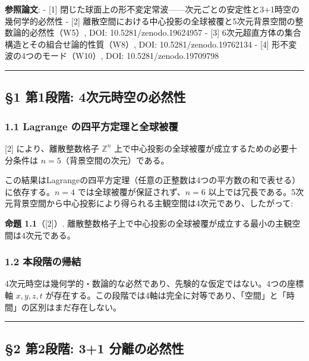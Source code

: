 \documentclass[
  a4paper,11pt]{ltjsarticle}
\begin{document}
\textbf{参照論文}: - {[}1{]}
閉じた球面上の形不変定常波------次元ごとの安定性と3+1時空の幾何学的必然性
- {[}2{]}
離散空間における中心投影の全球被覆と5次元背景空間の整数論的必然性（W5）,
DOI: 10.5281/zenodo.19624957 - {[}3{]}
6次元超直方体の集合構造とその組合せ論的性質（W8）, DOI:
10.5281/zenodo.19762134 - {[}4{]} 形不変波の4つのモード（W10）, DOI:
10.5281/zenodo.19709798

\begin{center}\rule{0.5\linewidth}{0.5pt}\end{center}

\subsection{§1 第1段階:
4次元時空の必然性}\label{ux7b2c1ux6bb5ux968e-4ux6b21ux5143ux6642ux7a7aux306eux5fc5ux7136ux6027}

\subsubsection{1.1 Lagrange
の四平方定理と全球被覆}\label{lagrange-ux306eux56dbux5e73ux65b9ux5b9aux7406ux3068ux5168ux7403ux88abux8986}

{[}2{]} により、離散整数格子 \(\mathbb{Z}^n\)
上で中心投影の全球被覆が成立するための必要十分条件は
\(n = 5\)（背景空間の次元）である。

この結果はLagrangeの四平方定理（任意の正整数は4つの平方数の和で表せる）に依存する。\(n = 4\)
では全球被覆が保証されず、\(n = 6\)
以上では冗長である。5次元背景空間から中心投影により得られる主観空間は4次元であり、したがって:

\textbf{命題 1.1}（{[}2{]}）.
離散整数格子上で中心投影の全球被覆が成立する最小の主観空間は4次元である。

\subsubsection{1.2
本段階の帰結}\label{ux672cux6bb5ux968eux306eux5e30ux7d50}

4次元時空は幾何学的・数論的な必然であり、先験的な仮定ではない。4つの座標軸
\(x, y, z, t\)
が存在する。この段階では4軸は完全に対等であり、「空間」と「時間」の区別はまだ存在しない。

\begin{center}\rule{0.5\linewidth}{0.5pt}\end{center}

\subsection{§2 第2段階: 3+1
分離の必然性}\label{ux7b2c2ux6bb5ux968e-31-ux5206ux96e2ux306eux5fc5ux7136ux6027}
\end{document}
